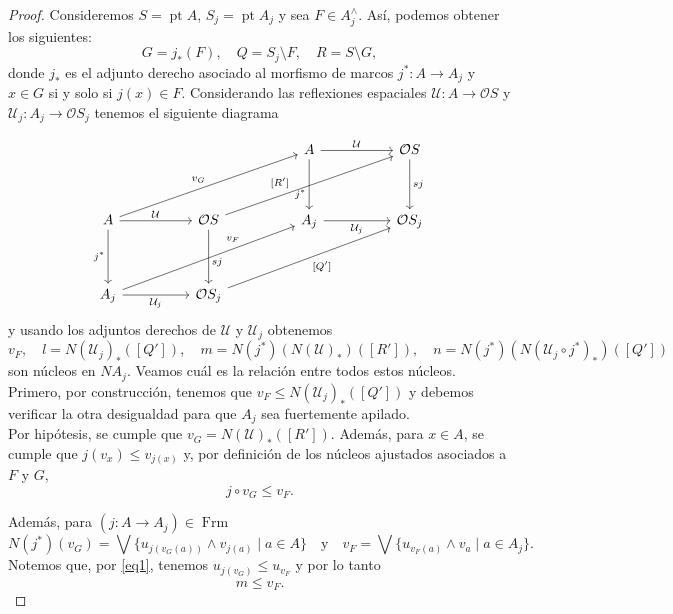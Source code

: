 \documentclass[12pt]{article}
\DeclareMathOperator{\Frm}{Frm}
\DeclareMathOperator{\pt}{pt}
\begin{document}
\begin{proof}
Consideremos $S=\pt A$, $S_j=\pt A_j$ y sea $F\in A_j^{\wedge}$. Así, podemos obtener los siguientes:
\[
G=j_*(F),\quad Q=S_j\setminus F,\quad R=S\setminus G,
\]
donde $j_*$ es el adjunto derecho asociado al morfismo de marcos $j^*\colon A\to A_j$ y $x\in G$ si y solo si $j(x)\in F$. Considerando las reflexiones espaciales $\mathcal{U}\colon A\to \mathcal{O}S$ y $\mathcal{U}_j\colon A_j\to \mathcal{O}S_j$ tenemos el siguiente diagrama

\[\begin{tikzcd}
	&&&& A && {\mathcal{O}S} \\
	\\
	A && {\mathcal{O}S} && {A_j} && {\mathcal{O}S_j} \\
	\\
	{A_j} && {\mathcal{O}S_j}
	\arrow["{\mathcal{U}}", from=1-5, to=1-7]
	\arrow["{j^*}"'{pos=0.7}, from=1-5, to=3-5]
	\arrow["sj", from=1-7, to=3-7]
	\arrow["{v_{G}}", from=3-1, to=1-5]
	\arrow["{\mathcal{U}}", from=3-1, to=3-3]
	\arrow["{j^*}"', from=3-1, to=5-1]
	\arrow["{[R']}"{pos=0.4}, from=3-3, to=1-7]
	\arrow["sj"{pos=0.6}, from=3-3, to=5-3]
	\arrow["{\mathcal{U}_j}"', from=3-5, to=3-7]
	\arrow["{v_F}"{pos=0.7}, from=5-1, to=3-5]
	\arrow["{\mathcal{U}_j}"', from=5-1, to=5-3]
	\arrow["{[Q']}"', from=5-3, to=3-7]
\end{tikzcd}\]
y usando los adjuntos derechos de $\mathcal{U}$ y $\mathcal{U}_j$ obtenemos
\[
v_F, \quad l=N(\mathcal{U}_j)_*([Q']),\quad m=N(j^*)(N(\mathcal{U})_*)([R']),\quad n=N(j^*)(N(\mathcal{U}_j\circ j^*)_*)([Q']) 
\]
son núcleos en $NA_j$. Veamos cuál es la relación entre todos estos núcleos.\\

Primero, por construcción, tenemos que $v_F\leq  N(\mathcal{U}_j)_*([Q'])$ y debemos verificar la otra desigualdad para que $A_j$ sea fuertemente apilado.\\

Por hipótesis, se cumple que $v_G=N(\mathcal{U})_*([R'])$. Además, para $x\in A$, se cumple que $j(v_x)\leq v_{j(x)}$ y, por definición de los núcleos ajustados asociados a $F$ y $G$, 
\begin{equation}\label{eq1}
j\circ v_G\leq v_F.
\end{equation}

Además, para $(j\colon A\to A_j)\in\Frm$ 
\[
N(j^*)(v_G)=\bigvee\{u_{j(v_G(a))}\wedge v_{j(a)}\mid a\in A\}\quad \text{y}\quad v_F=\bigvee\{u_{v_F(a)}\wedge v_a\mid a\in A_j\}. 
\]
Notemos que, por \eqref{eq1}, tenemos $u_{j(v_G)}\leq u_{v_F}$ y por lo tanto 
\begin{equation}\label{eq2}
m\leq v_F. 
\end{equation}


\end{proof}
\end{document}
